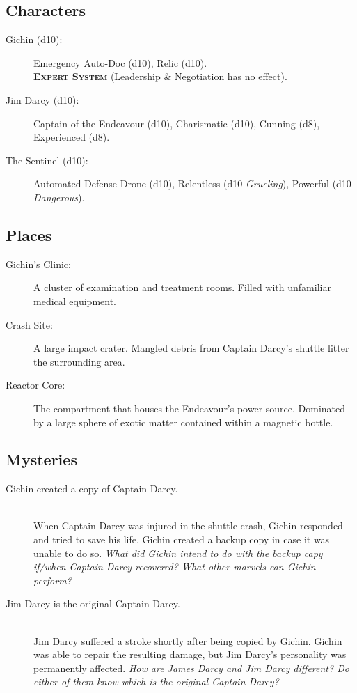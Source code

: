 \documentclass[11pt, a5paper, parskip=half-, DIV=12]{scrartcl}
\begin{document}
\subsection*{Characters}
\begin{description}
	\item[Gichin (d10):] Emergency Auto-Doc (d10), Relic (d10).\\\textbf{\textsc{Expert System}} (Leadership \& Negotiation has no effect).
	\item[Jim Darcy (d10):] Captain of the Endeavour (d10), Charismatic (d10), Cunning (d8), Experienced (d8).
	\item[The Sentinel (d10):] Automated Defense Drone (d10), Relentless (d10 \textit{Grueling}), Powerful (d10 \textit{Dangerous}).

\end{description}

\subsection*{Places}
\begin{description}
	\item[Gichin's Clinic:] A cluster of examination and treatment rooms. Filled with unfamiliar medical equipment.
	\item[Crash Site:] A large impact crater. Mangled debris from Captain Darcy's shuttle litter the surrounding area.
	\item[Reactor Core:] The compartment that houses the Endeavour's power source. Dominated by a large sphere of exotic matter contained within a magnetic bottle.
\end{description}

\subsection*{Mysteries}
\begin{description}
	\item[Gichin created a copy of Captain Darcy.] \phantom{a} \\ When Captain Darcy was injured in the shuttle crash, Gichin responded and tried to save his life. Gichin created a backup copy in case it was unable to do so. \textit{What did Gichin intend to do with the backup capy if/when Captain Darcy recovered? What other marvels can Gichin perform?}
	\item[Jim Darcy is the original Captain Darcy.] \phantom{a} \\
	Jim Darcy suffered a stroke shortly after being copied by Gichin. Gichin was able to repair the resulting damage, but Jim Darcy's personality was permanently affected. \textit{How are James Darcy and Jim Darcy different? Do either of them know which is the original Captain Darcy?} 
\end{description}
\end{document}
